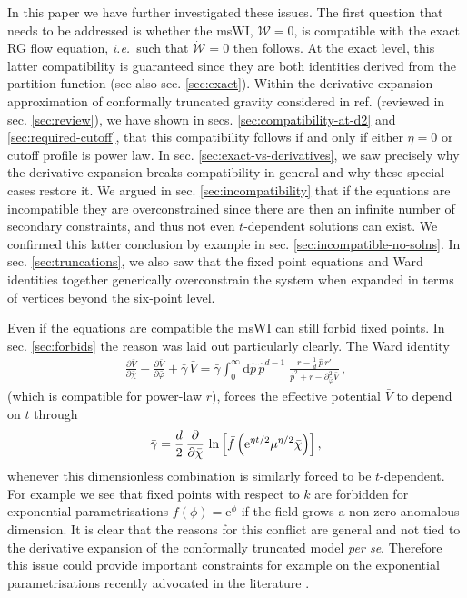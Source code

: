 \documentclass[11pt]{book} %
\newcommand\ie{\textit{i.e.}\ }
\newcommand{\bc}{\bar \chi}
\newcommand{\bV}{\bar V}
\numberwithin{equation}{chapter}
\begin{document}
{In this paper we have further investigated these issues.
The first question that needs to be addressed is whether the msWI,
$\mathcal{W}=0$, is compatible with the exact RG flow equation, \ie such that $\dot{\mathcal{W}}=0$ then follows.
At the exact level, this latter compatibility is guaranteed since they are both identities derived from the
partition function (see also sec. \ref{sec:exact}).
Within the derivative expansion approximation of conformally truncated gravity considered in ref.
\cite{Dietz:2015owa} (reviewed in sec. \ref{sec:review}),
we have shown  in secs. \ref{sec:compatibility-at-d2} and \ref{sec:required-cutoff},
that this compatibility follows if and only if either $\eta=0$ or cutoff profile is power law.
In sec. \ref{sec:exact-vs-derivatives}, we saw precisely why the derivative expansion breaks compatibility
in general and why these special cases restore it.
We argued in sec. \ref{sec:incompatibility} that if the equations are incompatible they are overconstrained
since there are then an infinite number of secondary constraints,
and thus not even $t$-dependent solutions can exist.
We confirmed this latter conclusion by example in sec. \ref{sec:incompatible-no-solns}.
In sec. \ref{sec:truncations},
we also saw that the fixed point equations and Ward identities together generically overconstrain the
system when expanded in terms of vertices beyond the six-point level.

Even if the equations are compatible the msWI can still forbid fixed points.
In sec. \ref{sec:forbids} the reason was laid out particularly clearly. The Ward identity
\begin{align}
  \frac{\partial \bar V}{\partial \bar\chi} - \frac{\partial \bar V}{\partial \bar\varphi} + \bar \gamma \, \bar V = \bar \gamma
  \int_0^{\infty} \mathrm d\hat p \, \hat p^{d-1} \; \frac{r - \frac{1}{d} \, \hat p \, r'}{\hat p^2 + r - \partial^2_{\bar\varphi}\bar V} \,,
\end{align}
(which is compatible for power-law $r$),
forces the effective potential $\bV$ to depend on $t$ through
\begin{align}
  \bar{\gamma} = \frac{d}{2} \, \frac{\partial}{\partial\bc} \,
  \ln \left[ \bar{f} \left({\rm e}^{\eta t/2}\mu^{\eta/2}\bc \right) \right] ,
\end{align}
whenever this dimensionless combination is similarly forced to be $t$-dependent.
For example we see that fixed points with respect to $k$ are forbidden for exponential parametrisations
$f(\phi) = \mathrm e ^ \phi$  if the field grows a non-zero anomalous dimension.
It is clear that the reasons for this conflict are general and not tied to the derivative expansion
of the conformally truncated model \textit{per se}.
Therefore this issue could provide important constraints for example on the exponential parametrisations
recently advocated in the literature
\cite{Demmel:2015zfa,Eichhorn:2013xr,Eichhorn:2015bna,Nink:2014yya,Percacci:2015wwa,
Ohta:2015efa,Gies:2015tca}.

}
\end{document}
